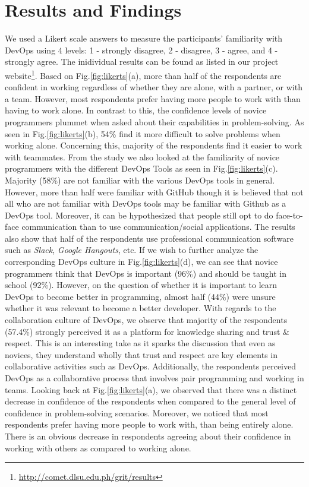 \documentclass{sigchi}
\begin{document}
\section{Results and Findings}
We used a Likert scale answers to measure the participants' familiarity with DevOps using 4 levels: 1 - strongly disagree, 2 - disagree, 3 - agree, and 4 - strongly agree. The inidividual results can be found as listed in our project website\footnote{\url{http://comet.dlsu.edu.ph/grit/results}}.  Based on Fig.\ref{fig:likerts}(a), more than half of the respondents are confident in working regardless of whether they are alone, with a partner, or with a team. However, most respondents prefer having more people to work with than having to work alone.  In contrast to this, the confidence levels of novice programmers plummet when asked about their capabilities in problem-solving. As seen in Fig.\ref{fig:likerts}(b), 54\% find it more difficult to solve problems when working alone. Concerning this, majority of the respondents find it easier to work with teammates. From the study we also looked at the familiarity of novice programmers with the different DevOps Tools as seen in Fig.\ref{fig:likerts}(c). Majority (58\%) are not familiar with the various DevOps tools in general. However, more than half were familiar with GitHub though it is believed that not all who are not familiar with DevOps tools may be familiar with Github as a DevOps tool. Moreover, it can be hypothesized that people still opt to do face-to-face communication than to use communication/social applications. The results also show that half of the respondents use professional communication software such as \textit{Slack}, \textit{Google Hangouts}, etc. If we wish to further analyze the corresponding DevOps culture in Fig.\ref{fig:likerts}(d), we can see that novice programmers think that DevOps is important (96\%) and should be taught in school (92\%). However, on the question of whether it is important to learn DevOps to become better in programming, almost half (44\%) were unsure whether it was relevant to become a better developer. With regards to the collaboration culture of DevOps, we observe that majority of the respondents (57.4\%) strongly perceived it as a platform for knowledge sharing and trust \& respect. This is an interesting take as it sparks the discussion that even as novices, they understand wholly that trust and respect are key elements in collaborative activities such as DevOps. Additionally, the respondents perceived DevOps as a collaborative process that involves pair programming and working in teams. Looking back at Fig.\ref{fig:likerts}(a), we observed that there was a distinct decrease in confidence of the respondents when compared to the general level of confidence in problem-solving scenarios. Moreover, we noticed that most respondents prefer having more people to work with, than being entirely alone. There is an obvious decrease in respondents agreeing about their confidence in working with others as compared to working alone.
\end{document}

